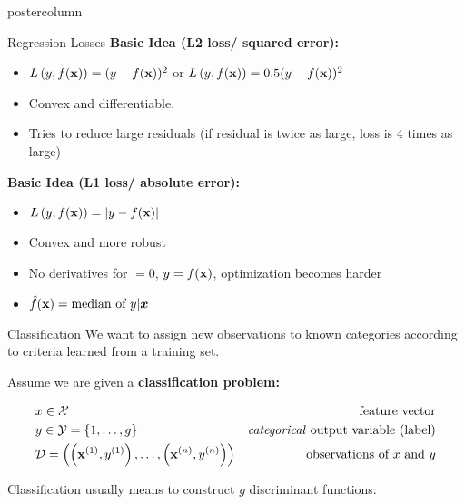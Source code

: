 \documentclass{beamer}
\begin{document}
\begin{frame}[fragile]{}
\begin{columns}
\begin{column}{.31\textwidth}
\begin{beamercolorbox}[center]{postercolumn}
\begin{minipage}{.98\textwidth}
{\begin{myblock}{Regression Losses}
			\textbf{Basic Idea (L2 loss/ squared error):}
						
						
						\begin{itemize}    
						\setlength{\itemindent}{+.3in}
              \item $L\left(y, f(\mathbf{x})\right) = (y-f(\mathbf{x}))^2$ or $L\left(y, f(\mathbf{x})\right) = 0.5 (y-f(\mathbf{x}))^2$
              \item Convex and differentiable.
              \item Tries to reduce large residuals (if residual is twice as large, loss is 4 times as large)      
            \end{itemize}

            \vspace*{1ex}


\textbf{Basic Idea (L1 loss/ absolute error):}


\begin{itemize}     \setlength{\itemindent}{+.3in}
\item $L\left(y, f(\mathbf{x})\right) = |y-f(\mathbf{x})|$
  \item Convex and more robust
\item No derivatives for $ = 0$, $y = f(\mathbf{x})$, optimization becomes harder
\item $\hat{f}(\mathbf{x}) = \text{median of } y | \bm{x}$      
  \end{itemize}


      \end{myblock}
\begin{myblock}{Classification}
						We want to assign new observations to known categories according to criteria learned from a training set.  
						\vspace*{1ex}
						
						    Assume we are given a \textbf{classification problem:}
						
						\begin{eqnarray*} & x \in \mathcal{X} \quad & \text{feature vector}\\ & y \in \mathcal{Y} = \{1, \ldots, g\} \quad & \text{\emph{categorical} output variable (label)}\\ &\mathcal{D} = \left( \left(\mathbf{x}^{(1)}, y^{(1)}\right), \ldots, \left(\mathbf{x}^{(n)}, y^{(n)}\right)\right) & \text{observations of $x$ and $y$} \end{eqnarray*}
						
						\vspace*{1ex}
						
						
							Classification usually means to construct $g$ discriminant functions:
						

\end{myblock}}
\end{minipage}
\end{beamercolorbox}
\end{column}
\end{columns}
\end{frame}
\end{document}
